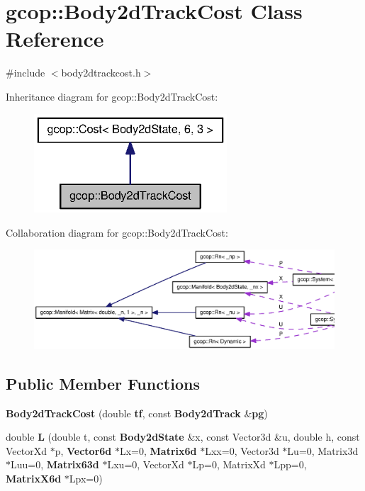 \section{gcop\-:\-:\-Body2d\-Track\-Cost \-Class \-Reference}
\label{classgcop_1_1Body2dTrackCost}


{\ttfamily \#include $<$body2dtrackcost.\-h$>$}



\-Inheritance diagram for gcop\-:\-:\-Body2d\-Track\-Cost\-:
\nopagebreak
\begin{figure}[H]
\begin{center}
\leavevmode
\includegraphics[width=204pt]{classgcop_1_1Body2dTrackCost__inherit__graph}
\end{center}
\end{figure}


\-Collaboration diagram for gcop\-:\-:\-Body2d\-Track\-Cost\-:
\nopagebreak
\begin{figure}[H]
\begin{center}
\leavevmode
\includegraphics[width=350pt]{classgcop_1_1Body2dTrackCost__coll__graph}
\end{center}
\end{figure}
\subsection*{\-Public \-Member \-Functions}
\begin{DoxyCompactItemize}
\item 
{\bf \-Body2d\-Track\-Cost} (double {\bf tf}, const {\bf \-Body2d\-Track} \&{\bf pg})
\item 
double {\bf \-L} (double t, const {\bf \-Body2d\-State} \&x, const \-Vector3d \&u, double h, const \-Vector\-Xd $\ast$p, {\bf \-Vector6d} $\ast$\-Lx=0, {\bf \-Matrix6d} $\ast$\-Lxx=0, \-Vector3d $\ast$\-Lu=0, \-Matrix3d $\ast$\-Luu=0, {\bf \-Matrix63d} $\ast$\-Lxu=0, \-Vector\-Xd $\ast$\-Lp=0, \-Matrix\-Xd $\ast$\-Lpp=0, {\bf \-Matrix\-X6d} $\ast$\-Lpx=0)
\end{DoxyCompactItemize}
